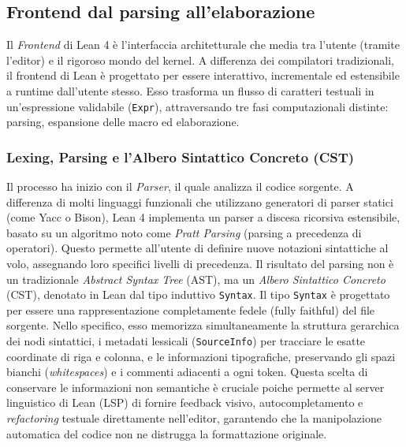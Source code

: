\subsection{Frontend dal parsing all'elaborazione}
Il \textit{Frontend} di Lean 4 è l'interfaccia architetturale che media tra l'utente (tramite l'editor) e il rigoroso mondo del kernel. A differenza dei compilatori 
tradizionali, il frontend di Lean è progettato per essere interattivo, incrementale ed estensibile a runtime dall'utente stesso. Esso trasforma un flusso di caratteri 
testuali in un'espressione validabile (\texttt{Expr}), attraversando tre fasi computazionali distinte: parsing, espansione delle macro ed elaborazione.

\subsubsection{Lexing, Parsing e l'Albero Sintattico Concreto (CST)}
Il processo ha inizio con il \emph{Parser}, il quale analizza il codice sorgente. A differenza di molti linguaggi funzionali che utilizzano generatori di parser statici 
(come Yacc o Bison), Lean 4 implementa un parser a discesa ricorsiva estensibile, basato su un algoritmo noto come \textit{Pratt Parsing} (parsing a precedenza di operatori). 
Questo permette all'utente di definire nuove notazioni sintattiche al volo, assegnando loro specifici livelli di precedenza. Il risultato del parsing non è un tradizionale
\textit{Abstract Syntax Tree} (AST), ma un \textit{Albero Sintattico Concreto} (CST), denotato in Lean dal tipo induttivo \texttt{Syntax}. Il tipo \texttt{Syntax} è progettato 
per essere una rappresentazione completamente fedele (fully faithful) del file sorgente. Nello specifico, esso memorizza simultaneamente la struttura gerarchica dei nodi sintattici, 
i metadati lessicali (\texttt{SourceInfo}) per tracciare le esatte coordinate di riga e colonna, e le informazioni tipografiche, preservando gli spazi bianchi (\textit{whitespaces}) 
e i commenti adiacenti a ogni token. Questa scelta di conservare le informazioni non semantiche è cruciale poiche permette al server linguistico di Lean (LSP) di fornire feedback 
visivo, autocompletamento e \textit{refactoring} testuale direttamente nell'editor, garantendo che la manipolazione automatica del codice non ne distrugga la formattazione originale.

